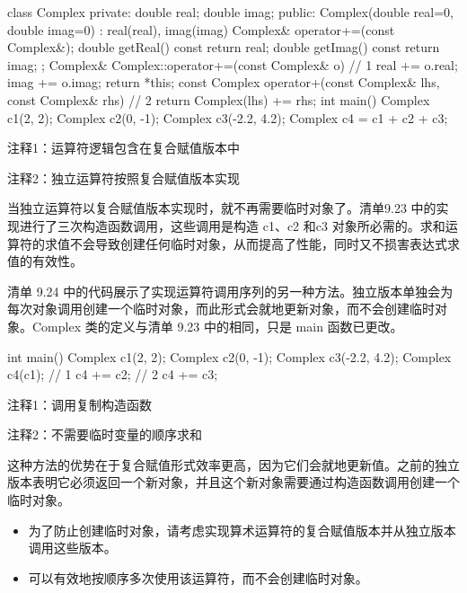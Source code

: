 
\begin{cpp}
class Complex {
private:
  double real;
  double imag;
public:
  Complex(double real=0, double imag=0) : real(real), imag(imag) {}
  Complex& operator+=(const Complex&);
  double getReal() const { return real; }
  double getImag() const { return imag; }
};
Complex& Complex::operator+=(const Complex& o) { // 1
  real += o.real;
  imag += o.imag;
  return *this;
}
const Complex operator+(const Complex& lhs, const Complex& rhs) { // 2
  return Complex(lhs) += rhs;
}
int main() {
  Complex c1(2, 2);
  Complex c2(0, -1);
  Complex c3(-2.2, 4.2);
  Complex c4 = c1 + c2 + c3;
}
\end{cpp}

{\footnotesize
注释1：运算符逻辑包含在复合赋值版本中

注释2：独立运算符按照复合赋值版本实现
}

当独立运算符以复合赋值版本实现时，就不再需要临时对象了。清单9.23 中的实现进行了三次构造函数调用，这些调用是构造 c1、c2 和c3 对象所必需的。求和运算符的求值不会导致创建任何临时对象，从而提高了性能，同时又不损害表达式求值的有效性。

清单 9.24 中的代码展示了实现运算符调用序列的另一种方法。独立版本单独会为每次对象调用创建一个临时对象，而此形式会就地更新对象，而不会创建临时对象。Complex 类的定义与清单 9.23 中的相同，只是 main 函数已更改。


\begin{cpp}
int main() {
  Complex c1(2, 2);
  Complex c2(0, -1);
  Complex c3(-2.2, 4.2);
  Complex c4(c1); // 1
  c4 += c2; // 2
  c4 += c3;
}
\end{cpp}

{\footnotesize
注释1：调用复制构造函数

注释2：不需要临时变量的顺序求和
}

这种方法的优势在于复合赋值形式效率更高，因为它们会就地更新值。之前的独立版本表明它必须返回一个新对象，并且这个新对象需要通过构造函数调用创建一个临时对象。


\begin{itemize}
\item
为了防止创建临时对象，请考虑实现算术运算符的复合赋值版本并从独立版本调用这些版本。

\item
可以有效地按顺序多次使用该运算符，而不会创建临时对象。
\end{itemize}













